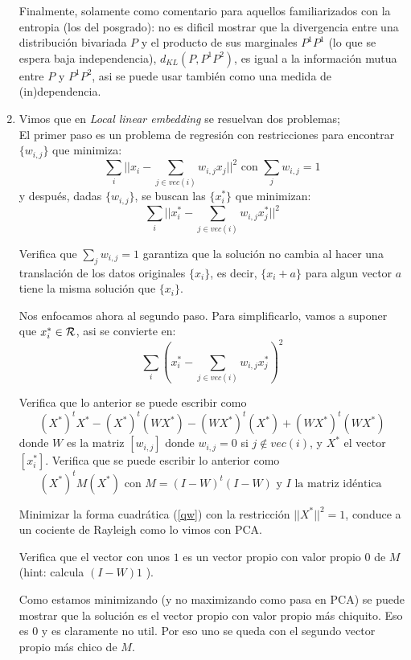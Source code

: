 \documentclass[12pt]{book}
\newcommand {\?}{?`}
\begin{document}
\begin{enumerate}
Finalmente, solamente como comentario para aquellos familiarizados con la entropia (los del posgrado): no es dificil mostrar que la divergencia entre una distribuci\'on bivariada $P$ y el producto de sus marginales $P^{1}P^{1}$ (lo que se espera baja independencia), $d_{KL}(P,  P^{1} P^{2}  )$, es igual a la informaci\'on mutua entre $P$ y $ P^{1} P^{2}$, asi se puede usar tambi\'en como una  medida de (in)dependencia.

\item
Vimos que en  {\it Local linear embedding} se resuelvan dos problemas;\\
El primer paso es un problema de regresi\'on con restricciones para encontrar $\{w_{i,j}\}$ que minimiza:
\[\sum_i ||x_i - \sum_{j\in vec(i)} w_{i,j} x_j||^2   \mbox{ con } \sum_j w_{i,j}=1 \]
y despu\'es, dadas $\{w_{i,j}\}$, se buscan las $\{ x_i^* \}$ que minimizan:
\[\sum_i ||x_i^* - \sum_{j\in vec(i)} w_{i,j} x_j^*||^2 \]

Verifica que $\sum_j w_{i,j}=1$ garantiza que la soluci\'on no cambia al hacer una translaci\'on de los datos originales  
$\{x_i\}$, es decir,  $\{x_i + a\}$ para algun vector $a$ tiene la misma soluci\'on que $\{x_i\}$.

Nos enfocamos ahora al segundo paso. Para simplificarlo, vamos a suponer que $x_i^* \in {\cal R}$, asi se convierte en:
\[\sum_i (x_i^* - \sum_{j\in vec(i)} w_{i,j} x_j^*)^2 \]

Verifica que lo anterior se puede escribir como
\[ (X^*)^t X^* -   (X^*)^t (W X^*) -  (W X^*)^t (X^*) + (WX^*)^t (WX^*) 
 \] donde $W$ es la matriz $[w_{i,j}]$ donde $w_{i,j}=0$ si $j \notin vec(i)$, y $X^*$ el vector $[x_i^*]$.
Verifica que se puede escribir lo anterior como
\begin{equation}  
\label{qw} (X^*)^tM (X^*) \mbox{ con } M=(I-W)^t(I-W)  \mbox{ y $I$ la matriz id\'entica } \end{equation}

Minimizar la forma cuadr\'atica (\ref{qw}) con la restricci\'on $|| X^*  ||^2=1$, conduce a un cociente de Rayleigh como lo vimos con PCA. 

Verifica que el vector con unos $1$  es un vector propio con valor propio 0 de $M$ (hint: calcula $(I-W)1$ ).

Como estamos minimizando (y no maximizando como pasa en PCA) se puede mostrar que la soluci\'on es el vector propio con valor propio m\'as chiquito. Eso es $0$ y es claramente no util. Por eso uno se queda con el segundo vector propio m\'as chico de $M$.


\end{enumerate}
\end{document}
